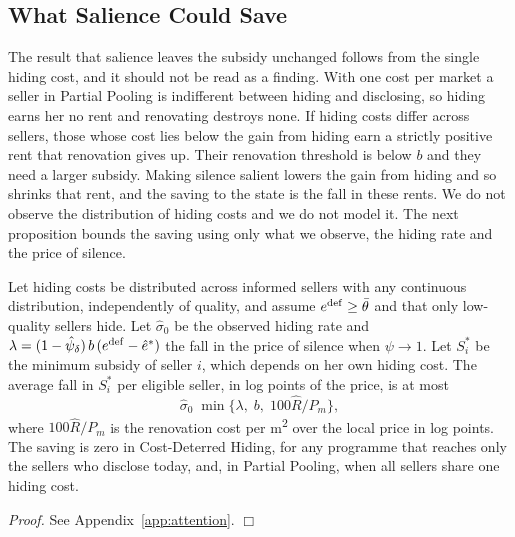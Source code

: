 \documentclass[10pt,letterpaper]{bp-template-concise}
\begin{document}
\subsection{What Salience Could Save}
\label{ss:att_saving}

The result that salience leaves the subsidy unchanged follows from the single hiding cost, and it should not be read as a finding. With one cost per market a seller in Partial Pooling is indifferent between hiding and disclosing, so hiding earns her no rent and renovating destroys none. If hiding costs differ across sellers, those whose cost lies below the gain from hiding earn a strictly positive rent that renovation gives up. Their renovation threshold is below $b$ and they need a larger subsidy. Making silence salient lowers the gain from hiding and so shrinks that rent, and the saving to the state is the fall in these rents. We do not observe the distribution of hiding costs and we do not model it. The next proposition bounds the saving using only what we observe, the hiding rate and the price of silence.

\begin{proposition}
\label{prop:att_saving}
Let hiding costs be distributed across informed sellers with any continuous distribution, independently of quality, and assume $e^{\rm def}\ge\bar\theta$ and that only low-quality sellers hide. Let $\hat\sigma_0$ be the observed hiding rate and $\lambda=(1-\hat\psi_\delta)\,b\,(e^{\rm def}-\hat e^*)$ the fall in the price of silence when $\psi\to1$. Let $S_i^*$ be the minimum subsidy of seller $i$, which depends on her own hiding cost. The average fall in $S_i^*$ per eligible seller, in log points of the price, is at most
\[
    \hat\sigma_0\;\min\{\lambda,\;b,\;100\hat R/P_m\},
\]
where $100\hat R/P_m$ is the renovation cost per m\textsuperscript{2} over the local price in log points. The saving is zero in Cost-Deterred Hiding, for any programme that reaches only the sellers who disclose today, and, in Partial Pooling, when all sellers share one hiding cost.
\end{proposition}

\noindent\textit{Proof.} See Appendix~\ref{app:attention}. $\Box$

\medskip
\end{document}
